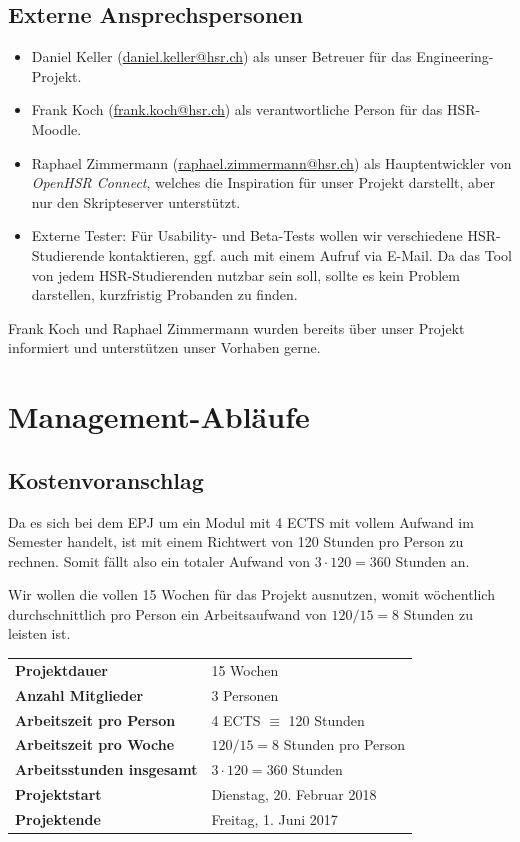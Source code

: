 \documentclass[a4paper]{article}
\let\oldsection\section
\renewcommand\section{\clearpage\oldsection}
\begin{document}
\subsection{Externe Ansprechspersonen}


\begin{itemize}
  \item Daniel Keller (\url{daniel.keller@hsr.ch}) als unser Betreuer für das Engineering-Projekt.
  \item Frank Koch (\url{frank.koch@hsr.ch}) als verantwortliche Person für das HSR-Moodle.
  \item Raphael Zimmermann (\url{raphael.zimmermann@hsr.ch}) als Hauptentwickler
    von \emph{OpenHSR Connect}, welches die
    Inspiration für unser Projekt darstellt, aber nur den Skripteserver
    unterstützt.
  \item Externe Tester: Für Usability- und Beta-Tests wollen wir verschiedene
    HSR-Studierende kontaktieren, ggf. auch mit einem Aufruf via E-Mail. Da das Tool von jedem HSR-Studierenden nutzbar sein soll, sollte es kein Problem darstellen, kurzfristig Probanden zu finden.
\end{itemize}

Frank Koch und Raphael Zimmermann wurden bereits über unser Projekt informiert
und unterstützen unser Vorhaben gerne.

\section{Management-Abläufe}
\subsection{Kostenvoranschlag}

Da es sich bei dem EPJ um ein Modul mit 4 ECTS mit vollem Aufwand im Semester handelt, ist mit einem Richtwert von 120 Stunden pro Person zu rechnen. Somit fällt also ein totaler Aufwand von $3 \cdot 120 = 360$ Stunden an.

Wir wollen die vollen 15 Wochen für das Projekt ausnutzen, womit wöchentlich
durchschnittlich pro Person ein Arbeitsaufwand von $120 / 15 = 8$ Stunden zu
leisten ist. \\[3em]

\begin{tabular}{ll}
  \textbf{Projektdauer} & 15 Wochen \\
  \textbf{Anzahl Mitglieder} & 3 Personen \\
  \textbf{Arbeitszeit pro Person} & 4 ECTS $\equiv$ 120 Stunden \\
  \textbf{Arbeitszeit pro Woche} & $120 / 15 = 8$ Stunden pro Person \\
  \textbf{Arbeitsstunden insgesamt} & $3 \cdot 120 = 360$ Stunden \\
  \textbf{Projektstart} & Dienstag, 20. Februar 2018 \\
  \textbf{Projektende} & Freitag, 1. Juni 2017
\end{tabular}
\end{document}
